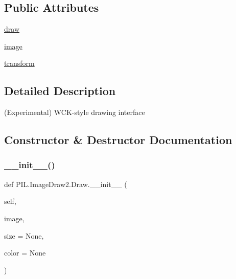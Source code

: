 \subsection*{Public Attributes}
\begin{DoxyCompactItemize}
\item 
\hyperlink{classPIL_1_1ImageDraw2_1_1Draw_a5cd20d375abbe63c5c1566d203405714}{draw}
\item 
\hyperlink{classPIL_1_1ImageDraw2_1_1Draw_a800176ea2a5efe96d9e96efb83f1aa73}{image}
\item 
\hyperlink{classPIL_1_1ImageDraw2_1_1Draw_a00d4c90aa6bdb164ac6322caa35a6309}{transform}
\end{DoxyCompactItemize}


\subsection{Detailed Description}
\begin{DoxyVerb}(Experimental) WCK-style drawing interface
\end{DoxyVerb}
 

\subsection{Constructor \& Destructor Documentation}
\mbox{\label{classPIL_1_1ImageDraw2_1_1Draw_adcf0c3ed78b06b5bc8581af3cc9e7592}} 
\subsubsection{\texorpdfstring{\+\_\+\+\_\+init\+\_\+\+\_\+()}{\_\_init\_\_()}}
{\footnotesize\ttfamily def P\+I\+L.\+Image\+Draw2.\+Draw.\+\_\+\+\_\+init\+\_\+\+\_\+ (\begin{DoxyParamCaption}\item[{}]{self,  }\item[{}]{image,  }\item[{}]{size = {\ttfamily None},  }\item[{}]{color = {\ttfamily None} }\end{DoxyParamCaption})}



